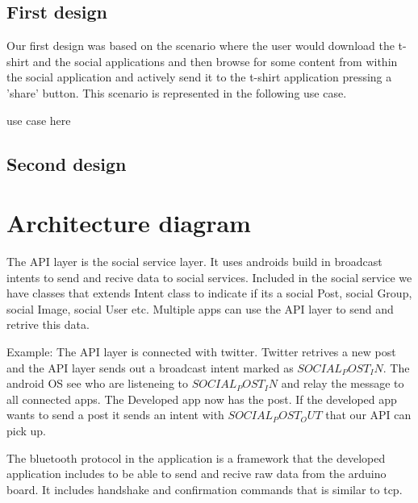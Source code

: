 \newpage

\subsection{First design}
Our first design was based on the scenario where the user would
download the t-shirt and the social applications and then browse for some content
from within the social application and actively send it to the t-shirt application
pressing a 'share' button. This scenario is represented in the following use case.

use case here




\subsection{Second design}


\newpage
\section{Architecture diagram}
The API layer is the social service layer. It uses androids build in broadcast intents to send and
recive data to social services. Included in the social service we have classes that extends Intent
class to indicate if its a social Post, social Group, social Image, social User etc. Multiple apps
can use the API layer to send and retrive this data.

Example:
The API layer is connected with twitter. Twitter retrives a new post and the API layer sends out
a broadcast intent marked as $SOCIAL_POST_IN$. The android OS see who are listeneing to $SOCIAL_POST_IN$ and relay the message to all connected apps. The Developed app now has the post. If the developed app wants to send a post it sends an intent with $SOCIAL_POST_OUT$ that our API can pick up.

The bluetooth protocol in the application is a framework that the developed application includes
to be able to send and recive raw data from the arduino board. It includes handshake and
confirmation commands that is similar to tcp.

